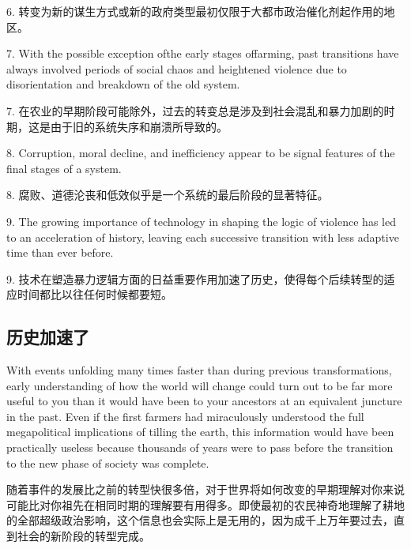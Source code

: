 \begin{Parallel}{97mm}{72mm}
  \ParallelRText
  {6. 转变为新的谋生方式或新的政府类型最初仅限于大都市政治催化剂起作用的地区。}
  \ParallelPar



  \ParallelLText
  {7. With the possible exception ofthe early stages offarming, past transitions have always involved periods of social chaos and heightened violence due to disorientation and breakdown of the old system.}
  
  \ParallelRText
  {7. 在农业的早期阶段可能除外，过去的转变总是涉及到社会混乱和暴力加剧的时期，这是由于旧的系统失序和崩溃所导致的。}
  \ParallelPar



  \ParallelLText
  {8. Corruption, moral decline, and inefficiency appear to be signal features of the final stages of a system.}
  
  \ParallelRText
  {8. 腐败、道德沦丧和低效似乎是一个系统的最后阶段的显著特征。}
  \ParallelPar



  \ParallelLText
  {9. The growing importance of technology in shaping the logic of violence has led to an acceleration of history, leaving each successive transition with less adaptive time than ever before.}
  
  \ParallelRText
  {9. 技术在塑造暴力逻辑方面的日益重要作用加速了历史，使得每个后续转型的适应时间都比以往任何时候都要短。}
  \ParallelPar

  \subsection{历史加速了}

  \ParallelLText
  {With events unfolding many times faster than during previous transformations, early understanding of how the world will change could turn out to be far more useful to you than it would have been to your ancestors at an equivalent juncture in the past. Even if the first farmers had miraculously understood the full megapolitical implications of tilling the earth, this information would have been practically useless because thousands of years were to pass before the transition to the new phase of society was complete.}
  
  \ParallelRText
  {随着事件的发展比之前的转型快很多倍，对于世界将如何改变的早期理解对你来说可能比对你祖先在相同时期的理解要有用得多。即使最初的农民神奇地理解了耕地的全部超级政治影响，这个信息也会实际上是无用的，因为成千上万年要过去，直到社会的新阶段的转型完成。}
  \ParallelPar



\end{Parallel}
